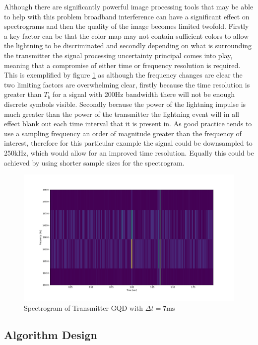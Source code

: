 Although there are significantly powerful image processing tools that may be able to help with this problem broadband interference can have a significant effect on spectrograms and then the quality of the image becomes limited twofold. Firstly a key factor can be that the color map may not contain sufficient colors to allow the lightning to be discriminated and secondly depending on what is surrounding the transmitter the signal processing uncertainty principal comes into play, meaning that a compromise of either time or frequency resolution is required. This is exemplified by figure \ref{fig:gqdspect} as although the frequency changes are clear the two limiting factors are overwhelming clear, firstly because the time resolution is greater than $T_b$ for a signal with 200Hz bandwidth there will not be enough discrete symbols visible. Secondly because the power of the lightning impulse is much greater than the power of the transmitter the lightning event will in all effect blank out each time interval that it is present in. As good practice tends to use a sampling frequency an order of magnitude greater than the frequency of interest, therefore for this particular example the signal could be downsampled to 250\si{\kilo\hertz}, which would allow for an improved time resolution. Equally this could be achieved by using shorter sample sizes for the spectrogram.

\begin{figure}[h!]
    \centering
    \includegraphics[width = \textwidth]{figs/sim/symRecovery/GQDSpectrogram.png}
    \caption{Spectrogram of Transmitter GQD with $\Delta t = 7\si{\milli\second}$}
    \label{fig:gqdspect}
\end{figure}

\subsection{Algorithm Design}

